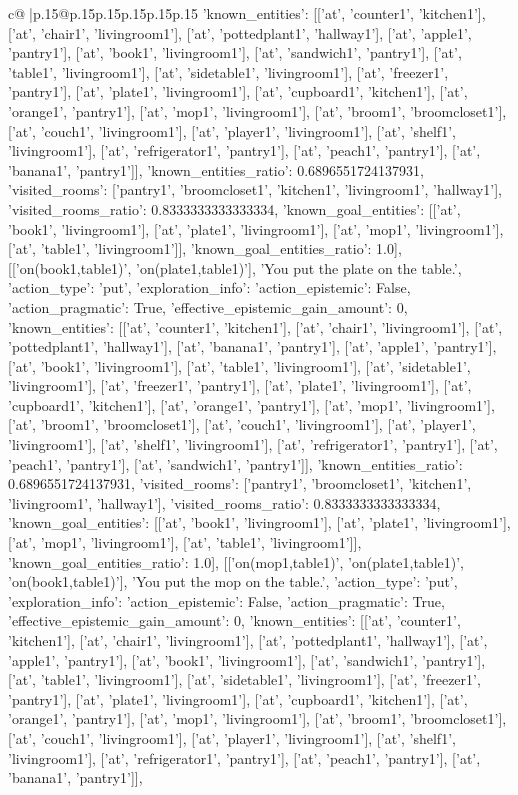 \documentclass{article}
\begin{document}
{\begin{supertabular}{c@{$\;$}|p{.15\linewidth}@{}p{.15\linewidth}p{.15\linewidth}p{.15\linewidth}p{.15\linewidth}p{.15\linewidth}}
{{{'known_entities': [['at', 'counter1', 'kitchen1'], ['at', 'chair1', 'livingroom1'], ['at', 'pottedplant1', 'hallway1'], ['at', 'apple1', 'pantry1'], ['at', 'book1', 'livingroom1'], ['at', 'sandwich1', 'pantry1'], ['at', 'table1', 'livingroom1'], ['at', 'sidetable1', 'livingroom1'], ['at', 'freezer1', 'pantry1'], ['at', 'plate1', 'livingroom1'], ['at', 'cupboard1', 'kitchen1'], ['at', 'orange1', 'pantry1'], ['at', 'mop1', 'livingroom1'], ['at', 'broom1', 'broomcloset1'], ['at', 'couch1', 'livingroom1'], ['at', 'player1', 'livingroom1'], ['at', 'shelf1', 'livingroom1'], ['at', 'refrigerator1', 'pantry1'], ['at', 'peach1', 'pantry1'], ['at', 'banana1', 'pantry1']], 'known_entities_ratio': 0.6896551724137931, 'visited_rooms': ['pantry1', 'broomcloset1', 'kitchen1', 'livingroom1', 'hallway1'], 'visited_rooms_ratio': 0.8333333333333334, 'known_goal_entities': [['at', 'book1', 'livingroom1'], ['at', 'plate1', 'livingroom1'], ['at', 'mop1', 'livingroom1'], ['at', 'table1', 'livingroom1']], 'known_goal_entities_ratio': 1.0}}], [['on(book1,table1)', 'on(plate1,table1)'], 'You put the plate on the table.', {'action_type': 'put', 'exploration_info': {'action_epistemic': False, 'action_pragmatic': True, 'effective_epistemic_gain_amount': 0, 'known_entities': [['at', 'counter1', 'kitchen1'], ['at', 'chair1', 'livingroom1'], ['at', 'pottedplant1', 'hallway1'], ['at', 'banana1', 'pantry1'], ['at', 'apple1', 'pantry1'], ['at', 'book1', 'livingroom1'], ['at', 'table1', 'livingroom1'], ['at', 'sidetable1', 'livingroom1'], ['at', 'freezer1', 'pantry1'], ['at', 'plate1', 'livingroom1'], ['at', 'cupboard1', 'kitchen1'], ['at', 'orange1', 'pantry1'], ['at', 'mop1', 'livingroom1'], ['at', 'broom1', 'broomcloset1'], ['at', 'couch1', 'livingroom1'], ['at', 'player1', 'livingroom1'], ['at', 'shelf1', 'livingroom1'], ['at', 'refrigerator1', 'pantry1'], ['at', 'peach1', 'pantry1'], ['at', 'sandwich1', 'pantry1']], 'known_entities_ratio': 0.6896551724137931, 'visited_rooms': ['pantry1', 'broomcloset1', 'kitchen1', 'livingroom1', 'hallway1'], 'visited_rooms_ratio': 0.8333333333333334, 'known_goal_entities': [['at', 'book1', 'livingroom1'], ['at', 'plate1', 'livingroom1'], ['at', 'mop1', 'livingroom1'], ['at', 'table1', 'livingroom1']], 'known_goal_entities_ratio': 1.0}}], [['on(mop1,table1)', 'on(plate1,table1)', 'on(book1,table1)'], 'You put the mop on the table.', {'action_type': 'put', 'exploration_info': {'action_epistemic': False, 'action_pragmatic': True, 'effective_epistemic_gain_amount': 0, 'known_entities': [['at', 'counter1', 'kitchen1'], ['at', 'chair1', 'livingroom1'], ['at', 'pottedplant1', 'hallway1'], ['at', 'apple1', 'pantry1'], ['at', 'book1', 'livingroom1'], ['at', 'sandwich1', 'pantry1'], ['at', 'table1', 'livingroom1'], ['at', 'sidetable1', 'livingroom1'], ['at', 'freezer1', 'pantry1'], ['at', 'plate1', 'livingroom1'], ['at', 'cupboard1', 'kitchen1'], ['at', 'orange1', 'pantry1'], ['at', 'mop1', 'livingroom1'], ['at', 'broom1', 'broomcloset1'], ['at', 'couch1', 'livingroom1'], ['at', 'player1', 'livingroom1'], ['at', 'shelf1', 'livingroom1'], ['at', 'refrigerator1', 'pantry1'], ['at', 'peach1', 'pantry1'], ['at', 'banana1', 'pantry1']], }}}
\end{supertabular}}
\end{document}
